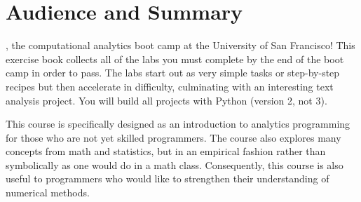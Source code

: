 \chapter{Audience and Summary}


, the computational analytics boot camp at the University of San Francisco! This exercise book collects all of the labs you must complete by the end of the boot camp in order to pass.  The labs start out as very simple tasks or step-by-step recipes but then accelerate in difficulty, culminating with an interesting text analysis project. You will build all projects with Python (version 2, not 3).

This course is specifically designed as an introduction to analytics programming for those who are not yet skilled programmers. The course also explores many concepts from math and statistics, but in an empirical fashion rather than symbolically as one would do in a math class. Consequently, this course is also useful to programmers who would like to strengthen their understanding of numerical methods.

